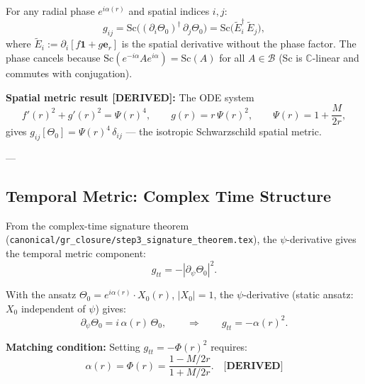 \begin{theorem}
\label{thm:phase_cancel}
For any radial phase $e^{i\alpha(r)}$ and spatial indices $i,j$:
\begin{equation}
  g_{ij} = \mathrm{Sc}\bigl((\partial_i\Theta_0)^\dagger\,\partial_j\Theta_0\bigr)
          = \mathrm{Sc}\bigl(\widetilde{E}_i^\dagger\,\widetilde{E}_j\bigr),
  \label{eq:phase_cancel}
\end{equation}
where $\widetilde{E}_i := \partial_i[f\mathbf{1}+g\boldsymbol{e}_r]$ is the spatial
derivative without the phase factor.  The phase cancels because
$\mathrm{Sc}(e^{-i\alpha}Ae^{i\alpha}) = \mathrm{Sc}(A)$ for all
$A \in \mathcal{B}$ (Sc is $\mathbb{C}$-linear and commutes with conjugation).
\end{theorem}

\noindent\textbf{Spatial metric result [DERIVED]:}
The ODE system
\begin{equation}
  f'(r)^2 + g'(r)^2 = \Psi(r)^4,\qquad
  g(r) = r\,\Psi(r)^2,\qquad
  \Psi(r) = 1 + \frac{M}{2r},
  \label{eq:schwarzschild_ode}
\end{equation}
gives $g_{ij}[\Theta_0] = \Psi(r)^4\,\delta_{ij}$ — the isotropic Schwarzschild
spatial metric.

---

\subsection{Temporal Metric: Complex Time Structure}

From the complex-time signature theorem
(\texttt{canonical/gr\_closure/step3\_signature\_theorem.tex}), the
$\psi$-derivative gives the temporal metric component:
\begin{equation}
  g_{tt} = -|\partial_\psi\Theta_0|^2.
  \label{eq:g_tt_psi}
\end{equation}

With the ansatz $\Theta_0 = e^{i\alpha(r)}\cdot X_0(r)$, $|X_0|=1$, the
$\psi$-derivative (static ansatz: $X_0$ independent of $\psi$) gives:
\begin{equation}
  \partial_\psi\Theta_0 = i\,\alpha(r)\,\Theta_0,
  \qquad\Longrightarrow\qquad
  g_{tt} = -\alpha(r)^2.
  \label{eq:g_tt_alpha}
\end{equation}

\noindent\textbf{Matching condition:} Setting $g_{tt} = -\Phi(r)^2$ requires:
\begin{equation}
  \alpha(r) = \Phi(r) = \frac{1 - M/2r}{1 + M/2r}.
  \label{eq:alpha_matching}
  \quad\textbf{[DERIVED]}
\end{equation}


